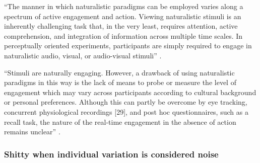 


%
``The manner in which naturalistic paradigms can be employed varies along a
spectrum of active engagement and action.
%
Viewing naturalistic stimuli is an inherently challenging task that, in the very
least, requires attention, active comprehension, and integration of information
across multiple time scales.
%
In perceptually oriented experiments, participants are simply required to engage
in naturalistic audio, visual, or audio-visual stimuli''
\citep{sonkusare2019naturalistic}.

%
``Stimuli are naturally engaging.
%
However, a drawback of using naturalistic paradigms in this way is the lack of
means to probe or measure the level of engagement which may vary across
participants according to cultural background or personal preferences.
%
Although this can partly be overcome by eye tracking, concurrent physiological
recordings [29], and post hoc questionnaires, such as a recall task, the nature
of the real-time engagement in the absence of action remains unclear''
\citep{sonkusare2019naturalistic}.


\subsubsection{Shitty when individual variation is considered noise}

